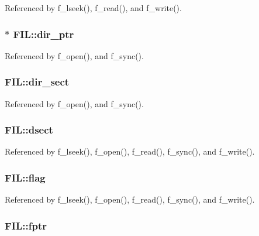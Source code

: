 Referenced by f\-\_\-lseek(), f\-\_\-read(), and f\-\_\-write().

\hypertarget{structFIL_a5af9e9fb312b629220eaf684dd28c4a9}{
\subsubsection[{dir\-\_\-ptr}]{$\ast$ F\-I\-L\-::dir\-\_\-ptr}}\label{structFIL_a5af9e9fb312b629220eaf684dd28c4a9}


Referenced by f\-\_\-open(), and f\-\_\-sync().

\hypertarget{structFIL_ab203794f939ad4480e81dfa488770783}{
\subsubsection[{dir\-\_\-sect}]{ F\-I\-L\-::dir\-\_\-sect}}\label{structFIL_ab203794f939ad4480e81dfa488770783}


Referenced by f\-\_\-open(), and f\-\_\-sync().

\hypertarget{structFIL_ab3d4165d6fd32ac71a130d835fbf0b4d}{
\subsubsection[{dsect}]{ F\-I\-L\-::dsect}}\label{structFIL_ab3d4165d6fd32ac71a130d835fbf0b4d}


Referenced by f\-\_\-lseek(), f\-\_\-open(), f\-\_\-read(), f\-\_\-sync(), and f\-\_\-write().

\hypertarget{structFIL_ac409508881f5a16f2998ae675072b376}{
\subsubsection[{flag}]{ F\-I\-L\-::flag}}\label{structFIL_ac409508881f5a16f2998ae675072b376}


Referenced by f\-\_\-lseek(), f\-\_\-open(), f\-\_\-read(), f\-\_\-sync(), and f\-\_\-write().

\hypertarget{structFIL_a75d29cf9257c827d117887b9f924c4a9}{
\subsubsection[{fptr}]{ F\-I\-L\-::fptr}}\label{structFIL_a75d29cf9257c827d117887b9f924c4a9}


